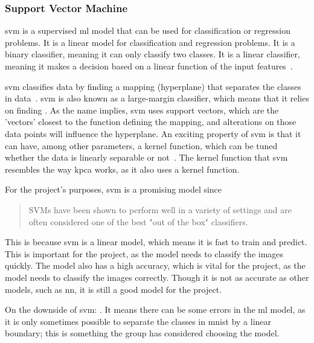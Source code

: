 \subsubsection{Support Vector Machine}\label{subsubsec:support-vector-machine}
\gls{svm} is a supervised \gls{ml} model that can be used for classification or regression problems. It is a linear model for classification and regression problems. It is a binary classifier, meaning it can only classify two classes. It is a linear classifier, meaning it makes a decision based on a linear function of the input features~\cite{james-statistical-learning1}.

\gls{svm} classifies data by finding a mapping (hyperplane) that separates the classes in data~\cite{faster-svm}. \gls{svm} is also known as a large-margin classifier, which means that it relies on finding . As the name implies, \gls{svm} uses support vectors, which are the 'vectors' closest to the function defining the mapping, and alterations on those data points will influence the hyperplane.
An exciting property of \gls{svm} is that it can have, among other parameters, a kernel function, which can be tuned whether the data is linearly separable or not~\cite{faster-svm}. The kernel function that \gls{svm} resembles the way \gls{kpca} works, as it also uses a kernel function.

For the project's purposes, \gls{svm} is a promising model since 

\blockcquote{james-statistical-learning1}{SVMs have been shown to perform well in a variety of settings and are often considered one of the best "out of the box" classifiers.}

This is because \gls{svm} is a linear model, which means it is fast to train and predict. This is important for the project, as the model needs to classify the images quickly. The model also has a high accuracy, which is vital for the project, as the model needs to classify the images correctly. Though it is not as accurate as other models, such as \gls{nn}, it is still a good model for the project. 

On the downside of \gls{svm}: . It means there can be some errors in the \gls{ml} model, as it is only sometimes possible to separate the classes in \gls{mnist} by a linear boundary; this is something the group has considered choosing the model.

